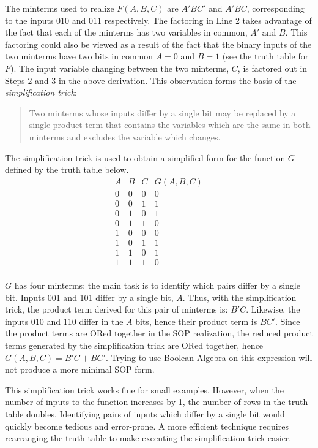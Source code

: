 The minterms used to realize $F(A,B,C)$ are $A'BC'$ and $A'BC$, corresponding 
to the inputs $010$ and $011$ respectively.  The factoring in Line
2 takes advantage of the fact that each of the minterms has two 
variables in common, $A'$ and $B$. This factoring could also be viewed
as a result of the fact that the binary inputs 
of the two minterms have two bits in common $A=0$ and $B=1$ (see 
the truth table for $F$).  The input variable changing between 
the two minterms, $C$, is factored out in Steps 2 and 3 in the above
derivation.  This observation forms the basis of the 
{\it simplification trick}: 

\begin{quote}
Two minterms whose inputs differ by a single bit may be replaced by
a single product term that contains the variables which are the same in 
both minterms and excludes the variable which changes.  
\end{quote}


The simplification trick is used to obtain a simplified form 
for the function $G$ defined by the truth table below.
$$\begin{array}{c|c|c||c}
A & B & C & G(A,B,C)  \\ \hline
0 & 0 & 0 & 0 \\ \hline
0 & 0 & 1 & 1 \\ \hline
0 & 1 & 0 & 1 \\ \hline
0 & 1 & 1 & 0 \\ \hline
1 & 0 & 0 & 0 \\ \hline
1 & 0 & 1 & 1 \\ \hline
1 & 1 & 0 & 1 \\ \hline
1 & 1 & 1 & 0 \\
\end{array} $$


$G$ has four minterms; the main task is to identify which
pairs differ by a single bit.  Inputs 001 and 101 differ by 
a single bit, $A$.  Thus, with the simplification trick,
the product term derived for this pair of minterms is: $B'C$.  
Likewise, the inputs 010 and 110 differ in the $A$ bits, hence
their product term is $BC'$.  Since the product terms are
ORed together in the SOP realization, the reduced product
terms generated by the simplification trick are ORed together,
hence $G(A,B,C)=B'C+BC'$.  Trying to use Boolean Algebra on 
this expression will not produce a more minimal SOP form.

This simplification trick works fine for small examples.
However, when the number of inputs to the function
increases by 1, the number of rows in the truth table
doubles.  Identifying pairs of inputs which differ
by a single bit would quickly become tedious and error-prone.
A more efficient technique requires rearranging the
truth table to make executing the simplification trick easier.

